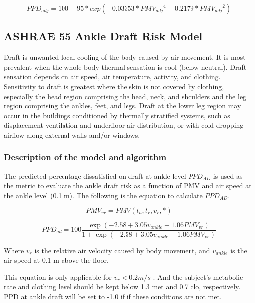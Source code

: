 \begin{equation}
PPD_{adj} = 100 - 95 * exp(-0.03353 * {PMV_{adj}}^4 - 0.2179 * {PMV_{adj}}^2)
\end{equation}

\subsection{ASHRAE 55 Ankle Draft Risk Model}\label{ankle-draft-risk-model}

Draft is unwanted local cooling of the body caused by air movement. It is most prevalent when the whole-body thermal sensation is cool (below neutral). Draft sensation depends on air speed, air temperature, activity, and clothing. Sensitivity to draft is greatest where the skin is not covered by clothing, especially the head region comprising the head, neck, and shoulders and the leg region comprising the ankles, feet, and legs. Draft at the lower leg region may occur in the buildings conditioned by thermally stratified systems, such as displacement ventilation and underfloor air distribution, or with cold-dropping airflow along external walls and/or windows.

\subsubsection{Description of the model and algorithm}\label{description-of-the-model-and-algorithm-5}

The predicted percentage dissatisfied on draft at ankle level \(PPD_{AD}\) is used as the metric to evaluate the ankle draft risk as a function of PMV and air speed at the ankle level (0.1 m). The following is the equation to calculate \(PPD_{AD}\).

\begin{equation}
PMV_{vr} = PMV(t_{a}, t_{r}, v_{r}, *)
\end{equation}

\begin{equation}
PPD_{ad} = 100 \frac{\exp(-2.58 + 3.05 v_{ankle} - 1.06 PMV_{vr})}{1 + \exp(-2.58 + 3.05 v_{ankle} - 1.06 PMV_{vr})}
\end{equation}

Where \(v_{r}\) is the relative air velocity caused by body movement, and \(v_{ankle}\) is the air speed at 0.1 m above the floor.

This equation is only applicable for \(v_{r} < 0.2 m/s\) . And the subject’s metabolic rate and clothing level should be kept below 1.3 met and 0.7 clo, respectively. PPD at ankle draft will be set to -1.0 if if these conditions are not met.

